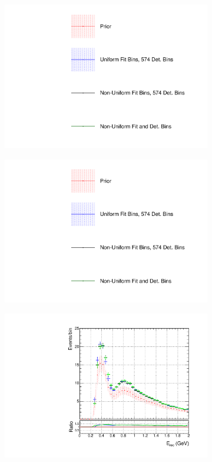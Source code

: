 \begin{figure}[!htbp]
\centering
\begin{subfigure}{0.3\textwidth}
  \centering
  \includegraphics[width=1.0\linewidth,  trim={5mm  80mm 0mm 0mm}, clip]{figs/polyasmvs_leg}
\end{subfigure}
\begin{subfigure}{0.3\textwidth}
  \centering
  \includegraphics[width=1.0\linewidth,  trim={5mm  0mm 0mm 95mm}, clip]{figs/polyasmvs_leg}
\end{subfigure}
\begin{subfigure}{.49\textwidth}
  \centering
  \includegraphics[width=0.95\linewidth]{figs/polySKnumu}

\end{subfigure}
\end{figure}
